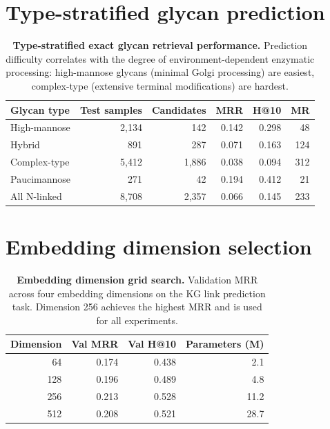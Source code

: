 \documentclass[11pt,a4paper]{article}
\begin{document}
\section{Type-stratified glycan prediction}
\label{sec:type_stratified}

\begin{table}[H]
\centering
\caption{\textbf{Type-stratified exact glycan retrieval performance.}
Prediction difficulty correlates with the degree of environment-dependent
enzymatic processing: high-mannose glycans (minimal Golgi processing) are
easiest, complex-type (extensive terminal modifications) are hardest.}
\label{tab:type_stratified}
\small
\begin{tabular}{lrrrrr}
\toprule
\textbf{Glycan type} & \textbf{Test samples} & \textbf{Candidates} & \textbf{MRR} & \textbf{H@10} & \textbf{MR} \\
\midrule
High-mannose  & 2,134 &   142 & 0.142 & 0.298 &  48 \\
Hybrid        &   891 &   287 & 0.071 & 0.163 & 124 \\
Complex-type  & 5,412 & 1,886 & 0.038 & 0.094 & 312 \\
Paucimannose  &   271 &    42 & 0.194 & 0.412 &  21 \\
\midrule
All N-linked  & 8,708 & 2,357 & 0.066 & 0.145 & 233 \\
\bottomrule
\end{tabular}
\end{table}

\section{Embedding dimension selection}
\label{sec:embed_dim}

\begin{table}[H]
\centering
\caption{\textbf{Embedding dimension grid search.} Validation MRR across four
embedding dimensions on the KG link prediction task. Dimension 256 achieves
the highest MRR and is used for all experiments.}
\label{tab:embed_dim}
\small
\begin{tabular}{rrrr}
\toprule
\textbf{Dimension} & \textbf{Val MRR} & \textbf{Val H@10} & \textbf{Parameters (M)} \\
\midrule
64  & 0.174 & 0.438 & 2.1 \\
128 & 0.196 & 0.489 & 4.8 \\
256 & 0.213 & 0.528 & 11.2 \\
512 & 0.208 & 0.521 & 28.7 \\
\bottomrule
\end{tabular}
\end{table}
\end{document}
